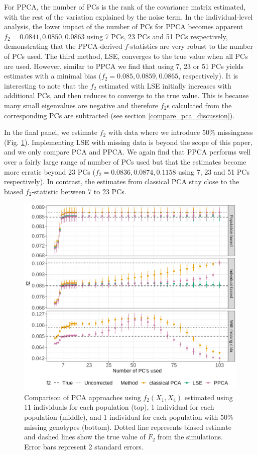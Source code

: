 \documentclass[12pt]{article}
\begin{document}
For PPCA, the number of PCs is the rank of the covariance matrix estimated, with the rest of the variation explained by the noise term. In the individual-level analysis, the lower impact of the number of PCs for PPCA becomes apparent $f_2 = 0.0841, 0.0850, 0.0863$ using 7 PCs, 23 PCs and 51 PCs respectively, demonstrating that the PPCA-derived $f$-statistics are very robust to the number of PCs used. The third method, LSE, converges to the true value when all PCs are used. However, similar to PPCA we find that using 7, 23 or 51 PCs yields estimates with a minimal bias ($f_2 = 0.085, 0.0859, 0.0865$, respectively). It is interesting to note that the $f_2$ estimated with LSE initially increases with additional PCs, and then reduces to converge to the true value. This is because many small eigenvalues are negative and therefore $f_2$s calculated from the corresponding PCs are subtracted (see section \ref{compare_pca_discussion}).

In the final panel, we estimate $f_2$ with data where we introduce $50\%$ missingness (Fig. \ref{fig:comparison}). Implementing LSE with missing data is beyond the scope of this paper, and we only compare PCA and PPCA. We again find that PPCA performs well over a fairly large range of number of PCs used but that the estimates become more erratic beyond 23 PCs ($f_2 = 0.0836, 0.0874, 0.1158$ using 7, 23 and 51 PCs respectively). In contrast, the estimates from classical PCA stay close to the biased $f_2$-statistic between 7 to 23 PCs.

\begin{figure}[ht!]
    \includegraphics[width=16.5cm]{Images/Figures/mu0.05_main_fig_all_pca.png}
    \centering
    \caption{Comparison of PCA approaches using $f_2(X_1,X_4)$ estimated using 11 individuals for each population (top), 1 individual for each population (middle), and 1 individual for each population with $50\%$ missing genotypes (bottom). Dotted line represents biased estimate and dashed lines show the true value of $F_2$ from the simulations. Error bars represent 2 standard errors.}
    \label{fig:comparison}
\end{figure}
\end{document}
